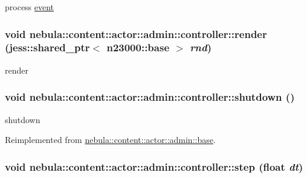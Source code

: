 process \hyperlink{structnebula_1_1content_1_1actor_1_1admin_1_1controller_1_1event}{event} \hypertarget{classnebula_1_1content_1_1actor_1_1admin_1_1controller_a0562e7a0508449775304548831563275}{
\subsubsection[{render}]{\setlength{\rightskip}{0pt plus 5cm}void nebula::content::actor::admin::controller::render (jess::shared\_\-ptr$<$ {\bf n23000::base} $>$ {\em rnd})}}
\label{classnebula_1_1content_1_1actor_1_1admin_1_1controller_a0562e7a0508449775304548831563275}


render \hypertarget{classnebula_1_1content_1_1actor_1_1admin_1_1controller_a745fba99f1dab2a7bdc5f5c54d14a8e2}{
\subsubsection[{shutdown}]{\setlength{\rightskip}{0pt plus 5cm}void nebula::content::actor::admin::controller::shutdown ()}}
\label{classnebula_1_1content_1_1actor_1_1admin_1_1controller_a745fba99f1dab2a7bdc5f5c54d14a8e2}


shutdown 

Reimplemented from \hyperlink{classnebula_1_1content_1_1actor_1_1admin_1_1base_a5f8943404407602a6757d3ab448d4a75}{nebula::content::actor::admin::base}.\hypertarget{classnebula_1_1content_1_1actor_1_1admin_1_1controller_a0cac5286fe3874391eea6dabae7ce06a}{
\subsubsection[{step}]{\setlength{\rightskip}{0pt plus 5cm}void nebula::content::actor::admin::controller::step (float {\em dt})}}
\label{classnebula_1_1content_1_1actor_1_1admin_1_1controller_a0cac5286fe3874391eea6dabae7ce06a}


